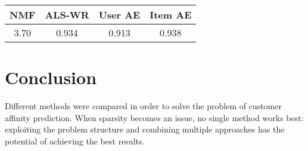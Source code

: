 \documentclass[10pt,twocolumn]{article}
\begin{document}
\vspace{0.5cm}
\begin{center}
\begin{tabular}{|c|c|c|c|}
  \hline
  NMF & ALS-WR & User AE & Item AE \\
  \hline
  3.70 & 0.934 & 0.913 & 0.938 \\
  \hline
\end{tabular}
\end{center}

\section{Conclusion}

Different methods were compared in order to solve the problem of customer affinity prediction. When sparsity becomes an issue, no single method works best: exploiting the problem structure and combining multiple approaches has the potential of achieving the best results.


\end{document}
